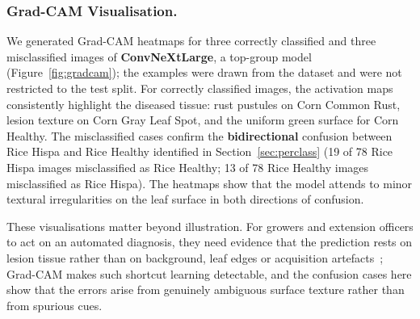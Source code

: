 \subsubsection{Grad-CAM Visualisation.}
\label{sec:gradcam_full}
We generated Grad-CAM heatmaps for three correctly classified and
three misclassified images of \textbf{ConvNeXtLarge}, a top-group
model (Figure~\ref{fig:gradcam}); the examples were drawn from the dataset
and were not restricted to the test split.
For correctly classified images, the activation maps consistently
highlight the diseased tissue: rust pustules on Corn Common Rust,
lesion texture on Corn Gray Leaf Spot, and the uniform green surface
for Corn Healthy.
The misclassified cases confirm the \textbf{bidirectional} confusion
between Rice Hispa and Rice Healthy identified in
Section~\ref{sec:perclass} (19 of 78 Rice Hispa images misclassified
as Rice Healthy; 13 of 78 Rice Healthy images misclassified as Rice
Hispa).
The heatmaps show that the model attends to minor textural
irregularities on the leaf surface in both directions of confusion.

These visualisations matter beyond illustration. For growers and
extension officers to act on an automated diagnosis, they need
evidence that the prediction rests on lesion tissue rather than on
background, leaf edges or acquisition artefacts~\cite{selvaraju2017};
Grad-CAM makes such shortcut learning detectable, and the confusion
cases here show that the errors arise from genuinely ambiguous surface
texture rather than from spurious cues.

